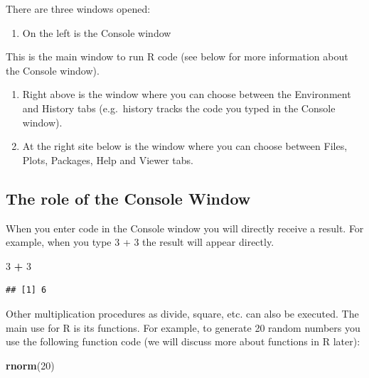 \documentclass[]{book}
\newenvironment{Shaded}{\begin{snugshade}}{\end{snugshade}}
\newcommand{\KeywordTok}[1]{\textcolor[rgb]{0.13,0.29,0.53}{\textbf{#1}}}
\newcommand{\DecValTok}[1]{\textcolor[rgb]{0.00,0.00,0.81}{#1}}
\newcommand{\StringTok}[1]{\textcolor[rgb]{0.31,0.60,0.02}{#1}}
\newcommand{\OperatorTok}[1]{\textcolor[rgb]{0.81,0.36,0.00}{\textbf{#1}}}
\newcommand{\NormalTok}[1]{#1}
\providecommand{\tightlist}{%
  \setlength{\itemsep}{0pt}\setlength{\parskip}{0pt}}
\theoremstyle{definition}
\theoremstyle{definition}
\theoremstyle{definition}
\theoremstyle{remark}
\begin{document}
There are three windows opened:

\begin{enumerate}
\def\labelenumi{\arabic{enumi}.}
\tightlist
\item
  On the left is the Console window
\end{enumerate}

This is the main window to run R code (see below for more information
about the Console window).

\begin{enumerate}
\def\labelenumi{\arabic{enumi}.}
\setcounter{enumi}{1}
\item
  Right above is the window where you can choose between the Environment
  and History tabs (e.g.~history tracks the code you typed in the
  Console window).
\item
  At the right site below is the window where you can choose between
  Files, Plots, Packages, Help and Viewer tabs.
\end{enumerate}

\subsection{The role of the Console
Window}\label{the-role-of-the-console-window}

When you enter code in the Console window you will directly receive a
result. For example, when you type 3 + 3 the result will appear
directly.

\begin{Shaded}
\begin{Highlighting}[]
\DecValTok{3} \OperatorTok{+}\StringTok{ }\DecValTok{3}
\end{Highlighting}
\end{Shaded}

\begin{verbatim}
## [1] 6
\end{verbatim}

Other multiplication procedures as divide, square, etc. can also be
executed. The main use for R is its functions. For example, to generate
20 random numbers you use the following function code (we will discuss
more about functions in R later):

\begin{Shaded}
\begin{Highlighting}[]
\KeywordTok{rnorm}\NormalTok{(}\DecValTok{20}\NormalTok{)}
\end{Highlighting}
\end{Shaded}
\end{document}
